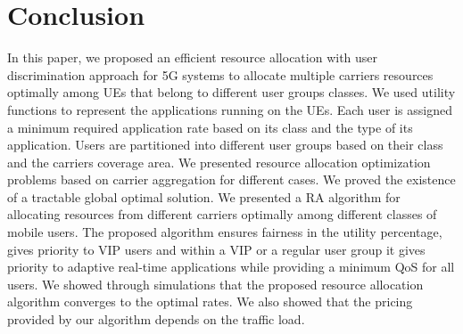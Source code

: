 \documentclass[journal]{IEEEtran} 				\IEEEoverridecommandlockouts 						\usepackage{amsmath,amssymb}
\begin{document}
\section{Conclusion}\label{sec:conclude}
In this paper, we proposed an efficient resource allocation with user discrimination approach for 5G systems to allocate multiple carriers resources optimally among UEs that belong to different user groups classes. We used utility functions to represent the applications running on the UEs. Each user is assigned a minimum required application rate based on its class and the type of its application. Users are partitioned into different user groups based on their class and the carriers coverage area. We presented resource allocation optimization problems based on carrier aggregation for different cases. We proved the existence of a tractable global optimal solution. We presented a RA algorithm for allocating resources from different carriers optimally among different classes of mobile users. The proposed algorithm ensures fairness in the utility percentage, gives priority to VIP users and within a VIP or a regular user group it gives priority to adaptive real-time applications while providing a minimum QoS for all users. We showed through simulations that the proposed resource allocation algorithm converges to the optimal rates. We also showed that the pricing provided by our algorithm depends on the traffic load.



\end{document}
